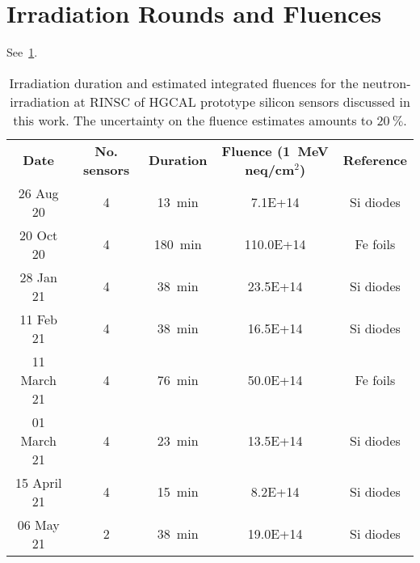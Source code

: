 \section{Irradiation Rounds and Fluences}
\label{appendix:irrad_rounds}
See~\ref{table:irrads}.
\begin{table}[h]
	\centering
	\begin{tabular}{c|cccc}
		\textbf{Date} & \textbf{No. sensors} & \textbf{Duration} & \textbf{Fluence (\SI{1}{\mega\eV} neq/cm$^2$)} & \textbf{Reference} \\
		26 Aug 20 & 4 & \SI{13}{\minute} & 7.1E+14 & Si diodes \\
		20 Oct 20 & 4 & \SI{180}{\minute} & 110.0E+14 & Fe foils \\
		28 Jan 21 & 4 & \SI{38}{\minute} & 23.5E+14 & Si diodes \\
		11 Feb 21 & 4 & \SI{38}{\minute} & 16.5E+14 & Si diodes \\
		11 March 21 & 4 & \SI{76}{\minute} & 50.0E+14 & Fe foils \\
		01 March 21 & 4 & \SI{23}{\minute} & 13.5E+14 & Si diodes \\
		15 April 21 & 4 & \SI{15}{\minute} & 8.2E+14 & Si diodes \\
		06 May 21 & 2 & \SI{38}{\minute} & 19.0E+14 & Si diodes \\
	\end{tabular}
	\caption{Irradiation duration and estimated integrated fluences for the neutron-irradiation at RINSC of HGCAL prototype silicon sensors discussed in this work.
	The uncertainty on the fluence estimates amounts to 20$~\%$.
	}
	\label{table:irrads}
\end{table}


